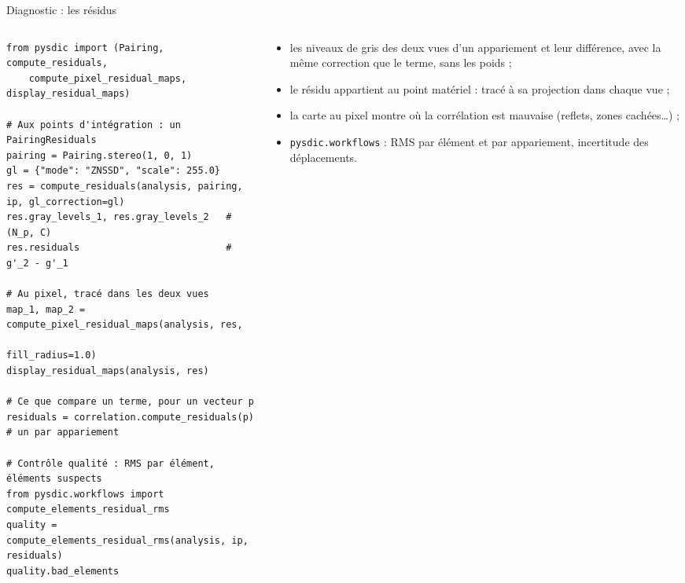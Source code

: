 \documentclass[aspectratio=169,11pt]{beamer}
\begin{document}
\begin{frame}[fragile]{Diagnostic : les résidus}
  \begin{columns}[T]
    \begin{column}{0.57\textwidth}
\begin{lstlisting}[basicstyle=\ttfamily\tiny]
from pysdic import (Pairing, compute_residuals,
    compute_pixel_residual_maps, display_residual_maps)

# Aux points d'intégration : un PairingResiduals
pairing = Pairing.stereo(1, 0, 1)
gl = {"mode": "ZNSSD", "scale": 255.0}
res = compute_residuals(analysis, pairing, ip, gl_correction=gl)
res.gray_levels_1, res.gray_levels_2   # (N_p, C)
res.residuals                          # g'_2 - g'_1

# Au pixel, tracé dans les deux vues
map_1, map_2 = compute_pixel_residual_maps(analysis, res,
                                           fill_radius=1.0)
display_residual_maps(analysis, res)

# Ce que compare un terme, pour un vecteur p
residuals = correlation.compute_residuals(p)  # un par appariement

# Contrôle qualité : RMS par élément, éléments suspects
from pysdic.workflows import compute_elements_residual_rms
quality = compute_elements_residual_rms(analysis, ip, residuals)
quality.bad_elements
\end{lstlisting}
    \end{column}
    \begin{column}{0.40\textwidth}\footnotesize
      \begin{itemize}\setlength{\itemsep}{2pt}
        \item les niveaux de gris des deux vues d'un appariement et leur différence,
              avec la \alert{même} correction que le terme, sans les poids ;
        \item le résidu appartient au point matériel : tracé à sa projection
              dans \alert{chaque} vue ;
        \item la carte au pixel montre \alert{où} la corrélation est mauvaise
              (reflets, zones cachées\dots) ;
        \item \texttt{pysdic.workflows} : RMS par élément et par appariement,
              incertitude des déplacements.
      \end{itemize}
    \end{column}
  \end{columns}
\end{frame}
\end{document}

